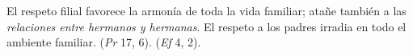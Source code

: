 	 El respeto filial favorece la armonía de toda la vida familiar; atañe también a las \emph{relaciones entre hermanos y hermanas}. El respeto a los padres irradia en todo el ambiente familiar.  (\emph{Pr} 17, 6).  (\emph{Ef} 4, 2).